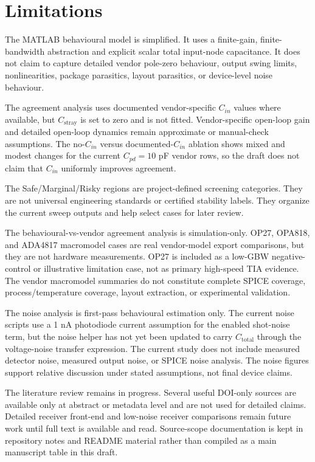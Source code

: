 \section{Limitations}

The MATLAB behavioural model is simplified. It uses a finite-gain, finite-bandwidth abstraction and explicit scalar total input-node capacitance. It does not claim to capture detailed vendor pole-zero behaviour, output swing limits, nonlinearities, package parasitics, layout parasitics, or device-level noise behaviour.

The agreement analysis uses documented vendor-specific $C_{in}$ values where available, but $C_{\mathrm{stray}}$ is set to zero and is not fitted. Vendor-specific open-loop gain and detailed open-loop dynamics remain approximate or manual-check assumptions. The no-$C_{in}$ versus documented-$C_{in}$ ablation shows mixed and modest changes for the current $C_{pd}=10$ pF vendor rows, so the draft does not claim that $C_{in}$ uniformly improves agreement.

The Safe/Marginal/Risky regions are project-defined screening categories. They are not universal engineering standards or certified stability labels. They organize the current sweep outputs and help select cases for later review.

The behavioural-vs-vendor agreement analysis is simulation-only. OP27, OPA818, and ADA4817 macromodel cases are real vendor-model export comparisons, but they are not hardware measurements. OP27 is included as a low-GBW negative-control or illustrative limitation case, not as primary high-speed TIA evidence. The vendor macromodel summaries do not constitute complete SPICE coverage, process/temperature coverage, layout extraction, or experimental validation.

The noise analysis is first-pass behavioural estimation only. The current noise scripts use a 1 nA photodiode current assumption for the enabled shot-noise term, but the noise helper has not yet been updated to carry $C_{\mathrm{total}}$ through the voltage-noise transfer expression. The current study does not include measured detector noise, measured output noise, or SPICE noise analysis. The noise figures support relative discussion under stated assumptions, not final device claims.

The literature review remains in progress. Several useful DOI-only sources are available only at abstract or metadata level and are not used for detailed claims. Detailed receiver front-end and low-noise receiver comparisons remain future work until full text is available and read. Source-scope documentation is kept in repository notes and README material rather than compiled as a main manuscript table in this draft.

